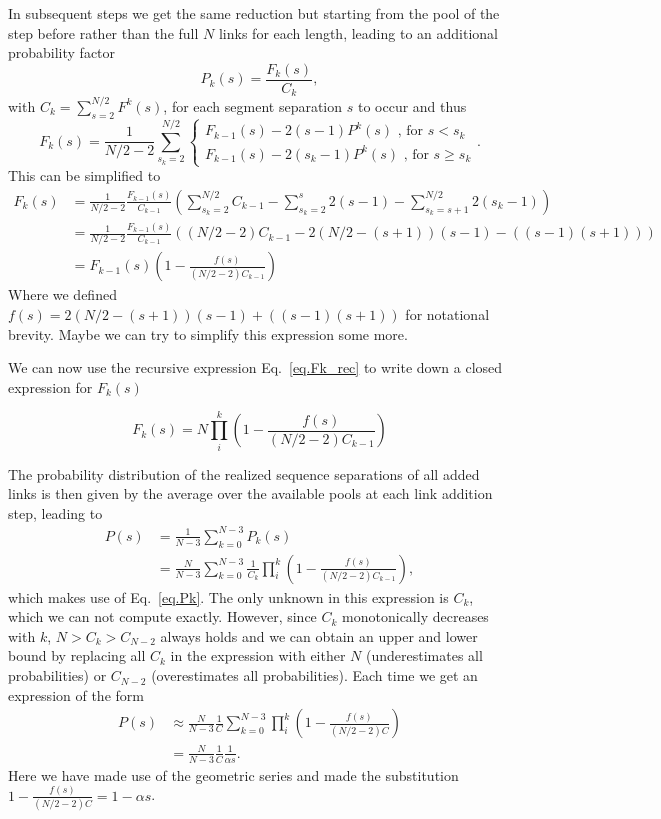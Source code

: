 \documentclass[reprint,amsmath,amssymb,rmp,onecolumn,notitlepage,11pt]{revtex4-1}
\newcommand{\red}[1]{\textcolor{red!80!black}{#1}}
\begin{document}
In subsequent steps we get the same reduction but starting from the pool of the step before rather than the full $N$ links for each length, leading to an additional probability factor 
\begin{equation}
    P_k(s)=\frac{F_k(s)}{C_k},
    \label{eq.Pk}
\end{equation}
with $C_k=\sum_{s=2}^{N/2}F^k(s)$, for each segment separation $s$ to occur and thus
\begin{equation}
    F_k(s)= \frac{1}{N/2-2} \sum_{s_k=2}^{N/2} {\begin{cases}
     F_{k-1}(s)-2(s-1) P^k(s) \text{ , for } s<s_k\\
     F_{k-1}(s)-2(s_k -1)P^k(s)\text{ , for } s\geq s_k
    \end{cases}}.
\end{equation}
This can be simplified to 
\begin{align}
   F_k(s)&= \frac{1}{N/2-2} \frac{F_{k-1}(s)}{C_{k-1}}\left( \sum_{s_k=2}^{N/2}C_{k-1} - \sum_{s_k=2}^{s} 2(s-1) - \sum_{s_k=s+1}^{N/2} 2(s_k -1) \right) \nonumber \\
   &= \frac{1}{N/2-2}\frac{F_{k-1}(s)}{C_{k-1}}\left((N/2-2)C_{k-1}- 2(N/2-(s+1))(s-1) - ((s-1)(s+1))\right)  \nonumber \\
   &=F_{k-1}(s)\left(1-\frac{f(s)}{(N/2-2)C_{k-1}} \right)
   \label{eq.Fk_rec}
\end{align}
Where we defined $f(s)=2(N/2-(s+1))(s-1) + ((s-1)(s+1))$ for notational brevity. \red{Maybe we can try to simplify this expression some more.}

We can now use the recursive expression Eq.~\ref{eq.Fk_rec} to write down a closed expression for $F_k(s)$

\begin{equation}
    F_k(s)=N\prod_{i}^k\left(1-\frac{f(s)}{(N/2-2)C_{k-1}} \right)
\end{equation}

The probability distribution of the realized sequence separations of all added links is then given by the average over the available pools at each link addition step, leading to
\begin{align}
    P(s)&=\frac{1}{N-3}\sum_{k=0}^{N-3} P_k(s) \nonumber \\
    &= \frac{N}{N-3}\sum_{k=0}^{N-3} \frac{1}{C_k}\prod_{i}^k\left(1-\frac{f(s)}{(N/2-2)C_{k-1}} \right),
\end{align}
which makes use of Eq.~\ref{eq.Pk}. The only unknown in this expression is $C_k$, which we can not compute exactly. However, since $C_k$ monotonically decreases with $k$, $N>C_k>C_{N-2}$ always holds and we can obtain an upper and lower bound by replacing all $C_k$ in the expression with either $N$ (underestimates all probabilities) or $C_{N-2}$ (overestimates all probabilities). Each time we get an expression of the form 
\begin{align}
     P(s)&\approx\frac{N}{N-3}\frac{1}{C}\sum_{k=0}^{N-3} \prod_{i}^k\left(1-\frac{f(s)}{(N/2-2)C} \right)\nonumber \\
     &=\frac{N}{N-3}\frac{1}{C} \frac{1}{\alpha s}.
\end{align}
Here we have made use of the geometric series and made the substitution $1-\frac{f(s)}{(N/2-2)C} = 1- \alpha s $.
\end{document}
